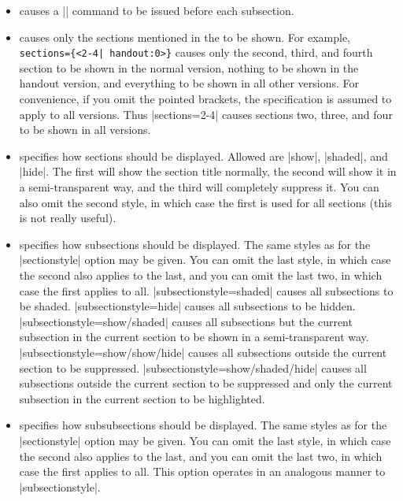 \begin{command}{\tableofcontents{}}
\begin{itemize}
  \item
     causes a |\pause| command to be issued before each subsection.
  \item
     causes only the sections mentioned in the  to be shown. For example, \verb/sections={<2-4| handout:0>}/ causes only the second, third, and fourth section to be shown in the normal version, nothing to be shown in the handout version, and everything to be shown in all other versions. For convenience, if you omit the pointed brackets, the specification is assumed to apply to all versions. Thus |sections={2-4}| causes sections two, three, and four to be shown in all versions.
  \item
     specifies how sections should be displayed. Allowed  are |show|, |shaded|, and |hide|. The first will show the section title normally, the second will show it in a semi-transparent way, and the third will completely suppress it. You can also omit the second style, in which case the first is used for all sections (this is not really useful).
  \item
     specifies how subsections should be displayed. The same styles as for the |sectionstyle| option may be given. You can omit the last style, in which case the second also applies to the last, and you can omit the last two, in which case the first applies to all.
    \example
    |subsectionstyle=shaded| causes all subsections to be shaded.
    \example
    |subsectionstyle=hide| causes all subsections to be hidden.
    \example
    |subsectionstyle=show/shaded| causes all subsections but the current subsection in the current section to be shown in a semi-transparent way.
    \example
    |subsectionstyle=show/show/hide| causes all subsections outside the current section to be suppressed.
    \example
    |subsectionstyle=show/shaded/hide| causes all subsections outside the current section to be suppressed and only the current subsection in the current section to be highlighted.
  \item
     specifies how subsubsections should be displayed. The same styles as for the |sectionstyle| option may be given. You can omit the last style, in which case the second also applies to the last, and you can omit the last two, in which case the first applies to all.
    This option operates in an analogous manner to |subsectionstyle|.
  \end{itemize}


\end{command}

